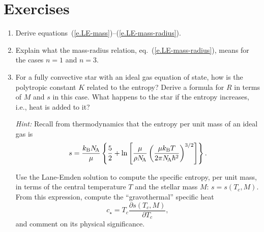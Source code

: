 \section{Exercises}\label{s.LE-exercises}
\begin{enumerate}
\item Derive equations~(\ref{e.LE-mass})--(\ref{e.LE-mass-radius}).

\item Explain what the mass-radius relation, eq.~(\ref{e.LE-mass-radius}), means for the cases $n=1$ and $n=3$.

\item For a fully convective star with an ideal gas equation of state, how is the polytropic constant $K$ related to the entropy? Derive a formula for $R$ in terms of $M$ and $s$ in this case.  What happens to the star if the entropy increases, i.e., heat is added to it?

\emph{Hint:} Recall from thermodynamics that the entropy per unit mass of an ideal gas is
\begin{equation}\label{e.exercise-entropy}
s = \frac{k_\mathrm{B} N_\mathrm{\!A}}{\mu}\left\{ \frac{5}{2} + \ln\left[\frac{\mu}{\rho N_\mathrm{\!A}}\left(\frac{\mu k_\mathrm{B} T}{2\pi N_\mathrm{\!A}\hbar^{2}}\right)^{3/2}\right]\right\}.
\end{equation}

Use the Lane-Emden solution to compute the specific entropy, per unit mass, in terms of the central temperature $T$ and the stellar mass $M$: $s = s(T_{c},M)$.  From this expression,  compute the ``gravothermal'' specific heat
\begin{equation}\label{e.cstar}
c_{\star} = T_{c}\frac{\partial s(T_{c},M)}{\partial T_{c}},
\end{equation}
and comment on its physical significance.

\end{enumerate}
